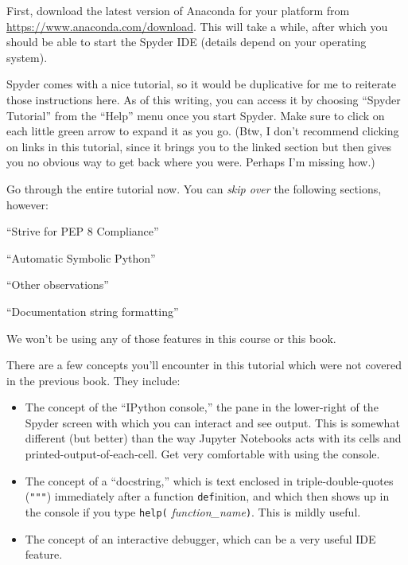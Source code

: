 First, download the latest version of Anaconda for your platform from
\url{https://www.anaconda.com/download}. This will take a while, after
which you should be able to start the Spyder IDE (details depend on your
operating system).

Spyder comes with a nice tutorial, so it would be duplicative for me to
reiterate those instructions here. As of this writing, you can access it by
choosing ``Spyder Tutorial'' from the ``Help'' menu once you start Spyder. Make
sure to click on each little green arrow to expand it as you go. (Btw, I don't
recommend clicking on links in this tutorial, since it brings you to the linked
section but then gives you no obvious way to get back where you were. Perhaps
I'm missing how.)

Go through the entire tutorial now. You can \textit{skip over} the following
sections, however:

\begin{compactitem}
\item ``Strive for PEP 8 Compliance''
\item ``Automatic Symbolic Python''
\item ``Other observations''
\item ``Documentation string formatting''
\end{compactitem}

We won't be using any of those features in this course or this book.

There are a few concepts you'll encounter in this tutorial which were not
covered in the previous book. They include:

\begin{itemize}
\itemsep.1em


\item The concept of the ``IPython console,'' the pane in the lower-right of
the Spyder screen with which you can interact and see output. This is somewhat
different (but better) than the way Jupyter Notebooks acts with its cells and
printed-output-of-each-cell. Get very comfortable with using the console.

\item The concept of a ``docstring,'' which is text enclosed in
triple-double-quotes (\texttt{"""}) immediately after a function
\texttt{def}inition, and which then shows up in the console if you type
\texttt{help(}
\textsl{function\_name}\texttt{)}. This is mildly useful.

\item The concept of an interactive debugger, which can be a very useful IDE
feature.

\end{itemize}

